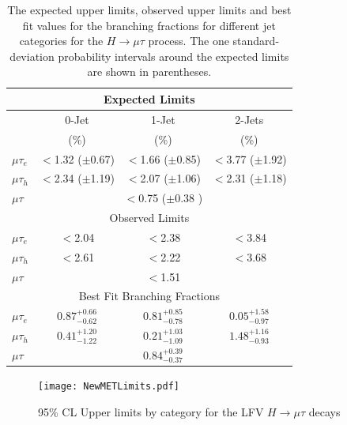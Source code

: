 \begin{table}[hbtp]
 \centering
  \caption{The expected upper limits, observed upper limits and best fit values for the branching fractions for different
    jet categories for the $H \rightarrow \mu \tau$  process.
    The one standard-deviation probability intervals around the expected limits are shown in parentheses.}
  \label{tab:expected_limits}
   \begin{tabular}{l|c|c|c} \hline
\multicolumn{4}{c}{Expected Limits} \\ \hline
                       &  \multicolumn{1}{c|}{0-Jet}   & \multicolumn{1}{c}{1-Jet}    &  \multicolumn{1}{|c}{2-Jets}                 \\
                       & (\%)                     & (\%)                     & (\%)                    \\ \cline{2-4}
          $\mu\tau_{e}$  &  $<$1.32 ($\pm$0.67)   &  $<$1.66 ($\pm$0.85)   &  $<$3.77 ($\pm$1.92)  \\
      $\mu\tau_{h}$    &  $<$2.34 ($\pm$1.19)   &  $<$2.07 ($\pm$1.06)   &  $<$2.31 ($\pm$1.18)  \\ \hline
            $\mu\tau$  &        \multicolumn{3}{c}{  $<$0.75 ($\pm$0.38 ) }                              \\ \hline
\multicolumn{4}{c}{Observed Limits} \\ \hline
          $\mu\tau_{e}$  &  $<$2.04                &  $<$2.38                &  $<$3.84   \\
      $\mu\tau_{h}$    &  $<$2.61                &  $<$2.22                &  $<$3.68   \\ \hline
            $\mu\tau$  & \multicolumn{3}{c}{  $<$1.51 }   \\ \hline
\multicolumn{4}{c}{Best Fit Branching Fractions} \\ \hline
      \rule[-5pt]{0pt}{17pt}
      $\mu\tau_{e}$  &  $0.87^{+0.66}_{-0.62}$  &  $0.81^{+0.85}_{-0.78}$  &  $0.05^{+1.58}_{-0.97}$  \\
      \rule[-5pt]{0pt}{17pt}
      $\mu\tau_{h}$    &  $0.41^{+1.20}_{-1.22}$  &  $0.21^{+1.03}_{-1.09}$  &  $1.48^{+1.16}_{-0.93}$  \\ \hline
      \rule[-5pt]{0pt}{17pt}
      $\mu\tau$  & \multicolumn{3}{c}{ $0.84^{+0.39}_{-0.37}$ }   \\ \hline
  \end{tabular}
\end{table}
\begin{figure}[hbtp]\centering
\texttt{[image: NewMETLimits.pdf]}
 \caption{95\% CL Upper limits by category for the LFV $H \rightarrow \mu \tau$  decays}
 \label{fig:limits_summary}\end{figure}


